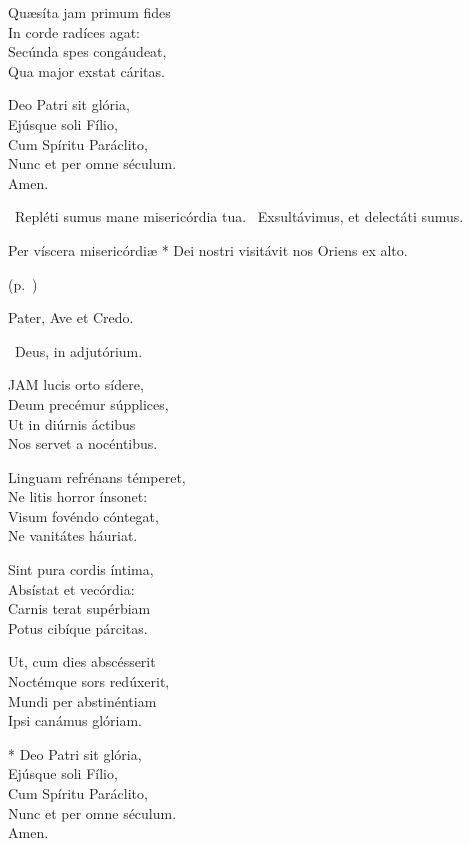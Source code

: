 Quæsíta jam primum fides\\
In corde radíces agat:\\
Secúnda spes congáudeat,\\
Qua major exstat cáritas.

Deo Patri sit glória,\\
Ejúsque soli Fílio,\\
Cum Spíritu Paráclito,\\
Nunc et per omne séculum.\\
Amen.

\V\ Repléti sumus mane misericórdia tua. \R\ Exsultávimus, et delectáti sumus.


 Per víscera misericórdiæ * Dei nostri visitávit nos Oriens ex alto.

 (p.~\pageref{feria6:precesferiales})


\sectionornament


Pater, Ave et Credo.

\V\ Deus, in adjutórium.


\lettrine[lines=2]{J}{AM} lucis orto sídere,\\
Deum precémur súpplices,\\
Ut in diúrnis áctibus\\
Nos servet a nocéntibus.

Linguam refrénans témperet,\\
Ne litis horror ínsonet:\\
Visum fovéndo cóntegat,\\
Ne vanitátes háuriat.

Sint pura cordis íntima,\\
Absístat et vecórdia:\\
Carnis terat supérbiam\\
Potus cibíque párcitas.

Ut, cum dies abscésserit\\
Noctémque sors redúxerit,\\
Mundi per abstinéntiam\\
Ipsi canámus glóriam.

* Deo Patri sit glória,\\
Ejúsque soli Fílio,\\
Cum Spíritu Paráclito,\\
Nunc et per omne séculum.\\
Amen.

